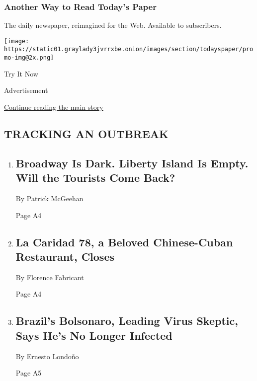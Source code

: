 \href{http://app.nytimes3xbfgragh.onion/todayspaper}{}

\hypertarget{another-way-to-read-todays-paper}{%
\subsubsection{Another Way to Read Today's
Paper}\label{another-way-to-read-todays-paper}}

The daily newspaper, reimagined for the Web. Available to subscribers.

\texttt{[image: https://static01.graylady3jvrrxbe.onion/images/section/todayspaper/promo-img@2x.png]}

Try It Now

Advertisement

\protect\hyperlink{after-mid1}{Continue reading the main story}

\hypertarget{tracking-an-outbreak}{%
\subsection{TRACKING AN OUTBREAK}\label{tracking-an-outbreak}}

\begin{enumerate}
\def\labelenumi{\arabic{enumi}.}
\item
  \href{/2020/07/24/nyregion/nyc-tourism-coronavirus.html}{}

  \hypertarget{broadway-is-dark-liberty-island-is-empty-will-the-tourists-come-back}{%
  \subsection{Broadway Is Dark. Liberty Island Is Empty. Will the
  Tourists Come
  Back?}\label{broadway-is-dark-liberty-island-is-empty-will-the-tourists-come-back}}

  By Patrick McGeehan

  Page A4
\item
  \href{/2020/07/24/dining/la-caridad-78-closes.html}{}

  \hypertarget{la-caridad-78-a-beloved-chinese-cuban-restaurant-closes}{%
  \subsection{La Caridad 78, a Beloved Chinese-Cuban Restaurant,
  Closes}\label{la-caridad-78-a-beloved-chinese-cuban-restaurant-closes}}

  By Florence Fabricant

  Page A4
\item
  \href{/2020/07/25/world/americas/bolsonaro-coronavirus.html}{}

  \hypertarget{brazils-bolsonaro-leading-virus-skeptic-says-hes-no-longer-infected}{%
  \subsection{Brazil's Bolsonaro, Leading Virus Skeptic, Says He's No
  Longer
  Infected}\label{brazils-bolsonaro-leading-virus-skeptic-says-hes-no-longer-infected}}

  By Ernesto Londoño

  Page A5
\end{enumerate}

